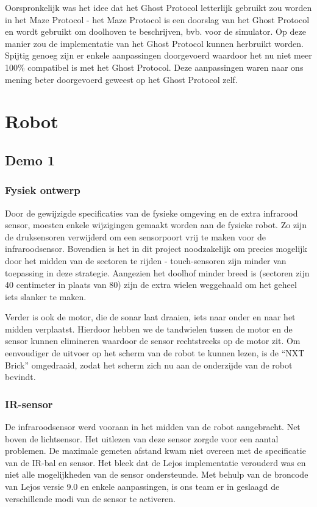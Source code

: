 \documentclass[12pt,a4paper]{report}
\begin{document}
Oorspronkelijk was het idee dat het Ghost Protocol letterlijk gebruikt zou worden in het Maze Protocol - het Maze Protocol is een doorslag van het Ghost Protocol en wordt gebruikt om doolhoven te beschrijven, bvb. voor de simulator. Op deze manier zou de implementatie van het Ghost Protocol kunnen herbruikt worden. Spijtig genoeg zijn er enkele aanpassingen doorgevoerd waardoor het nu niet meer 100\% compatibel is met het Ghost Protocol. Deze aanpassingen waren naar ons mening beter doorgevoerd geweest op het Ghost Protocol zelf.

\chapter{Robot}

\section{Demo 1}

\subsection{Fysiek ontwerp}

Door de gewijzigde specificaties van de fysieke omgeving en de extra infrarood sensor, moesten enkele wijzigingen gemaakt worden aan de fysieke robot. Zo zijn de druksensoren verwijderd om een sensorpoort vrij te maken voor de infraroodsensor. Bovendien is het in dit project noodzakelijk om precies mogelijk door het midden van de sectoren te rijden - touch-sensoren zijn minder van toepassing in deze strategie. Aangezien het doolhof minder breed is (sectoren zijn 40 centimeter in plaats van 80) zijn de extra wielen weggehaald om het geheel iets slanker te maken.

Verder is ook de motor, die de sonar laat draaien, iets naar onder en naar het midden verplaatst. Hierdoor hebben we de tandwielen tussen de motor en de sensor kunnen elimineren waardoor de sensor rechtstreeks op de motor zit. Om eenvoudiger de uitvoer op het scherm van de robot te kunnen lezen, is de ``NXT Brick'' omgedraaid, zodat het scherm zich nu aan de onderzijde van de robot bevindt.

\subsection{IR-sensor}

De infraroodsensor werd vooraan in het midden van de robot aangebracht. Net boven de lichtsensor. Het uitlezen van deze sensor zorgde voor een aantal problemen. De maximale gemeten afstand kwam niet overeen met de specificatie van de IR-bal en sensor. Het bleek dat de Lejos implementatie verouderd was en niet alle mogelijkheden van de sensor ondersteunde. Met behulp van de broncode van Lejos versie 9.0 en enkele aanpassingen, is ons team er in geslaagd de verschillende modi van de sensor te activeren.
\end{document}
